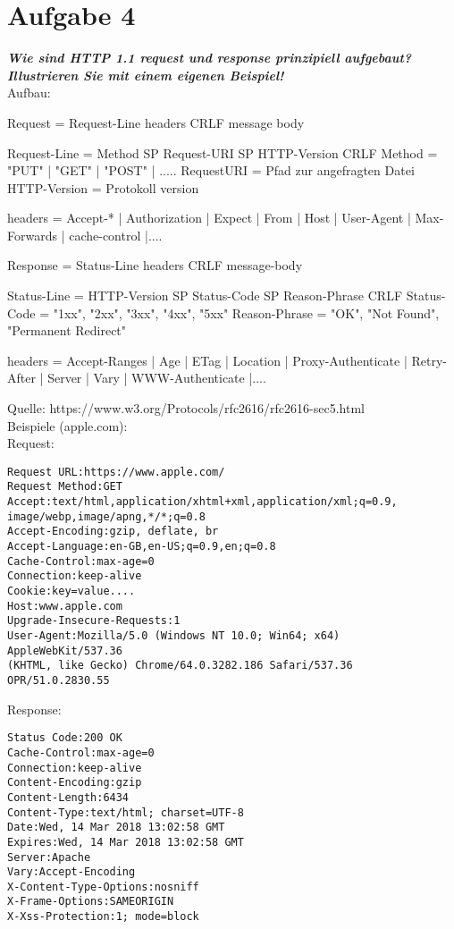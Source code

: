 \documentclass[12pt, a4paper]{report}
\begin{document}
\section*{Aufgabe 4}
\textbf{\textit{Wie sind HTTP 1.1 request und response prinzipiell aufgebaut? Illustrieren Sie mit einem
eigenen Beispiel!}}\\
Aufbau:
\begin{verbatimtab}
Request = Request-Line
	  headers
	  CRLF
	  message body

Request-Line = Method SP Request-URI SP HTTP-Version CRLF
Method 		 = "PUT" | "GET" | "POST" | .....
RequestURI   = Pfad zur angefragten Datei
HTTP-Version = Protokoll version

headers 	 = Accept-* | Authorization | Expect | From | Host
		| User-Agent | Max-Forwards | cache-control |....

Response = Status-Line
	   headers
	   CRLF
	   message-body

Status-Line   = HTTP-Version SP Status-Code SP Reason-Phrase CRLF
Status-Code   = "1xx", "2xx", "3xx", "4xx", "5xx"
Reason-Phrase = "OK", "Not Found", "Permanent Redirect"

headers = Accept-Ranges | Age | ETag | Location | Proxy-Authenticate
		| Retry-After | Server | Vary | WWW-Authenticate |....

\end{verbatimtab}
Quelle: https://www.w3.org/Protocols/rfc2616/rfc2616-sec5.html\\
Beispiele (apple.com):\\
Request:\\
\begin{verbatim}
Request URL:https://www.apple.com/
Request Method:GET
Accept:text/html,application/xhtml+xml,application/xml;q=0.9,
image/webp,image/apng,*/*;q=0.8
Accept-Encoding:gzip, deflate, br
Accept-Language:en-GB,en-US;q=0.9,en;q=0.8
Cache-Control:max-age=0
Connection:keep-alive
Cookie:key=value....
Host:www.apple.com
Upgrade-Insecure-Requests:1
User-Agent:Mozilla/5.0 (Windows NT 10.0; Win64; x64) AppleWebKit/537.36
(KHTML, like Gecko) Chrome/64.0.3282.186 Safari/537.36 OPR/51.0.2830.55
\end{verbatim}


Response:\\
\begin{verbatim}
Status Code:200 OK
Cache-Control:max-age=0
Connection:keep-alive
Content-Encoding:gzip
Content-Length:6434
Content-Type:text/html; charset=UTF-8
Date:Wed, 14 Mar 2018 13:02:58 GMT
Expires:Wed, 14 Mar 2018 13:02:58 GMT
Server:Apache
Vary:Accept-Encoding
X-Content-Type-Options:nosniff
X-Frame-Options:SAMEORIGIN
X-Xss-Protection:1; mode=block
\end{verbatim}
\end{document}
